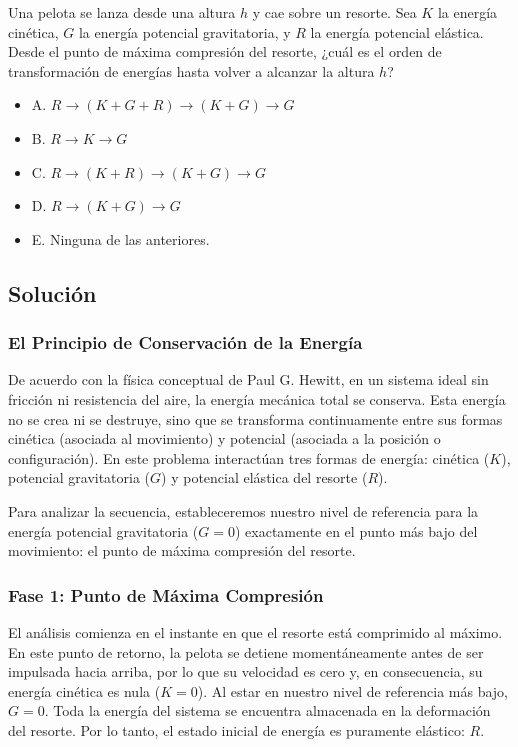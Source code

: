 \documentclass[12pt, a4paper]{article}
\begin{document}
 Una pelota se lanza desde una altura $h$ y cae sobre un resorte. Sea $K$ la energía cinética, $G$ la energía potencial gravitatoria, y $R$ la energía potencial elástica. Desde el punto de máxima compresión del resorte, ¿cuál es el orden de transformación de energías hasta volver a alcanzar la altura $h$?

\begin{itemize}
    \item A. $R \to (K + G + R) \to (K + G) \to G$
    \item B. $R \to K \to G$
    \item C. $R \to (K + R) \to (K + G) \to G$
    \item D. $R \to (K + G) \to G$
    \item E. Ninguna de las anteriores.
\end{itemize}

\subsection*{Solución}

\subsubsection*{El Principio de Conservación de la Energía}

De acuerdo con la física conceptual de Paul G. Hewitt, en un sistema ideal sin fricción ni resistencia del aire, la energía mecánica total se conserva. Esta energía no se crea ni se destruye, sino que se transforma continuamente entre sus formas cinética (asociada al movimiento) y potencial (asociada a la posición o configuración). En este problema interactúan tres formas de energía: cinética ($K$), potencial gravitatoria ($G$) y potencial elástica del resorte ($R$). 

Para analizar la secuencia, estableceremos nuestro nivel de referencia para la energía potencial gravitatoria ($G=0$) exactamente en el punto más bajo del movimiento: el punto de máxima compresión del resorte.

\subsubsection*{Fase 1: Punto de Máxima Compresión}

El análisis comienza en el instante en que el resorte está comprimido al máximo. En este punto de retorno, la pelota se detiene momentáneamente antes de ser impulsada hacia arriba, por lo que su velocidad es cero y, en consecuencia, su energía cinética es nula ($K=0$). Al estar en nuestro nivel de referencia más bajo, $G=0$. Toda la energía del sistema se encuentra almacenada en la deformación del resorte.
Por lo tanto, el estado inicial de energía es puramente elástico: $R$.
\end{document}
